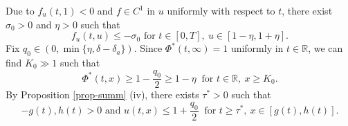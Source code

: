 \documentclass[11pt]{amsart}
\numberwithin{equation}{section}
\begin{document}
Due to $f_u(t,1)<0$  and $f\in C^1$ in $u$ uniformly with respect to $t$, there exist $\sigma_0>0$  and $\eta>0$ such that 
\begin{equation}\label{eq-f_usig}
  f_u(t,u)\leq -\sigma_0 \text{ for }t\in[0,T],\ u\in[1-\eta,1+\eta].
\end{equation}
Fix $q_0\in(0,\min\{\eta, \delta-\delta_a \})$. Since $\Phi^*(t,\infty)=1$ uniformly in $t\in\mathbb{R}$, we can find  $K_0\gg 1$  such that 
\begin{equation}\label{eq-1q_0}
    \Phi^*(t,x)\geq 1-\frac{q_0}{2}\geq  1-\eta ~\text{ for } t\in\mathbb{R}, ~x\geq K_0.
\end{equation}
By Proposition \ref{prop-summ} (iv),  there exists  $\tau^*>0$  such that
\begin{equation*}
  -g(t),h(t)>0 \text{ and }u(t,x)\leq 1+\frac{q_0}{2}~ \text{ for } t\geq \tau^*,\ x\in[g(t),h(t)].
\end{equation*}
\end{document}
